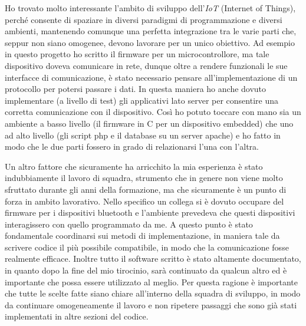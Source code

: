 \documentclass[a4paper,12pt]{article}
\begin{document}
Ho trovato molto interessante l'ambito di sviluppo dell'\textit{IoT} (Internet of Things), perch\'e consente di spaziare in diversi paradigmi di programmazione e diversi ambienti, mantenendo comunque una perfetta integrazione tra le varie parti che, seppur non siano omogenee, devono lavorare per un unico obiettivo. Ad esempio in questo progetto ho scritto il firmware per un microcontrollore, ma tale dispositivo doveva comunicare in rete, dunque oltre a rendere funzionali le sue interfacce di comunicazione, \`e stato necessario pensare all'implementazione di un protocollo per potersi passare i dati. In questa maniera ho anche dovuto implementare (a livello di test) gli applicativi lato server per consentire una corretta comunicazione con il dispositivo. Cos\`i ho potuto toccare con mano sia un ambiente a basso livello (il firmware in C per un dispositivo embedded) che uno ad alto livello (gli script php e il database su un server apache) e ho fatto in modo che le due parti fossero in grado di relazionarsi l'una con l'altra.

Un altro fattore che sicuramente ha arricchito la mia esperienza \`e stato indubbiamente il lavoro di squadra, strumento che in genere non viene molto sfruttato durante gli anni della formazione, ma che sicuramente \`e un punto di forza in ambito lavorativo. Nello specifico un collega si \`e dovuto occupare del firmware per i dispositivi bluetooth e l'ambiente prevedeva che questi dispositivi interagissero con quello programmato da me. A questo punto \`e stato fondamentale coordinarsi sui metodi di implementazione, in maniera tale da scrivere codice il pi\`u possibile compatibile, in modo che la comunicazione fosse realmente efficace. Inoltre tutto il software scritto \`e stato altamente documentato, in quanto dopo la fine del mio tirocinio, sar\`a continuato da qualcun altro ed \`e importante che possa essere utilizzato al meglio. Per questa ragione \`e importante che tutte le scelte fatte siano chiare all'interno della squadra di sviluppo, in modo da continuare omogeneamente il lavoro e non ripetere passaggi che sono gi\`a stati implementati in altre sezioni del codice.
\end{document}
